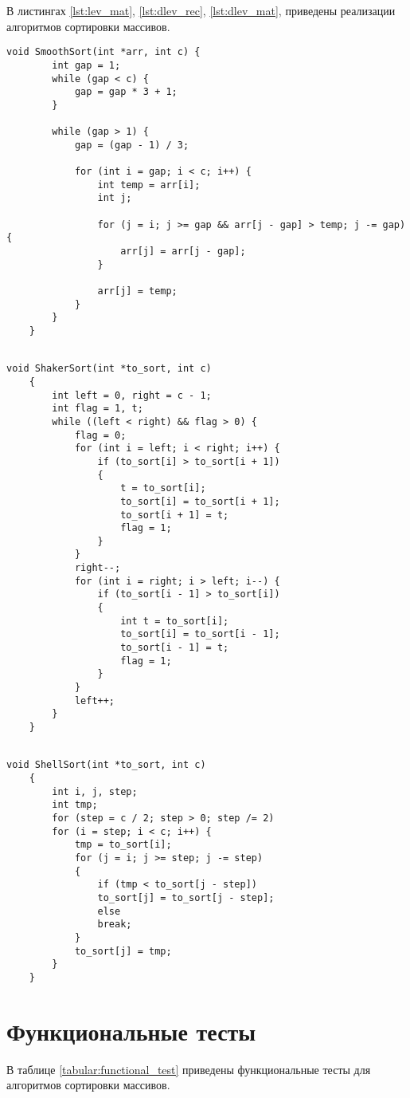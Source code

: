 В листингах \ref{lst:lev_mat}, \ref{lst:dlev_rec}, \ref{lst:dlev_mat},  приведены реализации алгоритмов сортировки массивов.
\newpage
\begin{lstlisting}[label=lst:lev_mat,caption=Плавная сортировка.]
	void SmoothSort(int *arr, int c) {
		int gap = 1;
		while (gap < c) {
			gap = gap * 3 + 1;
		}
		
		while (gap > 1) {
			gap = (gap - 1) / 3;
			
			for (int i = gap; i < c; i++) {
				int temp = arr[i];
				int j;
				
				for (j = i; j >= gap && arr[j - gap] > temp; j -= gap) {
					arr[j] = arr[j - gap];
				}
				
				arr[j] = temp;
			}
		}
	}
	
\end{lstlisting}
\newpage
\begin{lstlisting}[label=lst:dlev_rec,caption=Сортировка перемешиванием]
	void ShakerSort(int *to_sort, int c)
	{
		int left = 0, right = c - 1;
		int flag = 1, t;
		while ((left < right) && flag > 0) {
			flag = 0;
			for (int i = left; i < right; i++) {
				if (to_sort[i] > to_sort[i + 1])
				{
					t = to_sort[i];
					to_sort[i] = to_sort[i + 1];
					to_sort[i + 1] = t;
					flag = 1;
				}
			}
			right--;
			for (int i = right; i > left; i--) {
				if (to_sort[i - 1] > to_sort[i])
				{
					int t = to_sort[i];
					to_sort[i] = to_sort[i - 1];
					to_sort[i - 1] = t;
					flag = 1;
				}
			}
			left++;
		}
	}
	
\end{lstlisting}
\newpage
\begin{lstlisting}[label=lst:dlev_mat,caption=Сортировка Шелла]
	void ShellSort(int *to_sort, int c)
	{
		int i, j, step;
		int tmp;
		for (step = c / 2; step > 0; step /= 2)
		for (i = step; i < c; i++) {
			tmp = to_sort[i];
			for (j = i; j >= step; j -= step)
			{
				if (tmp < to_sort[j - step])
				to_sort[j] = to_sort[j - step];
				else
				break;
			}
			to_sort[j] = tmp;
		}
	}
\end{lstlisting}
\newpage

\section{Функциональные тесты}
В таблице \ref{tabular:functional_test} приведены функциональные тесты для алгоритмов сортировки массивов.


